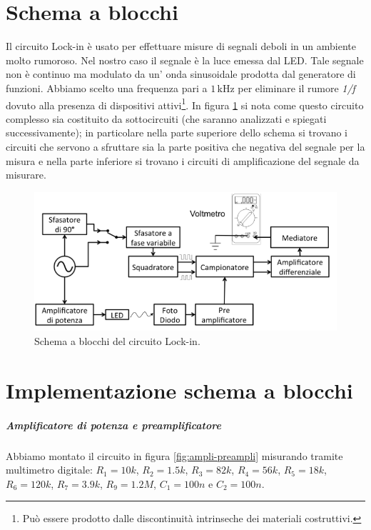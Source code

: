 \documentclass[10pt,a4paper]{article}
\begin{document}
\section{Schema a blocchi}
Il circuito Lock-in è usato per effettuare misure di segnali deboli in un ambiente molto rumoroso. Nel nostro caso il segnale è la luce emessa dal LED. Tale segnale non è continuo ma modulato da un' onda sinusoidale prodotta dal generatore di funzioni. Abbiamo scelto una frequenza pari a $1\,\mbox{kHz}$ per eliminare il rumore \emph{1/f} dovuto alla presenza di dispositivi attivi\footnote{Può essere prodotto dalle discontinuità intrinseche dei materiali costruttivi.}. In figura \ref{fig:schemablocchi} si nota come questo circuito complesso sia costituito da sottocircuiti (che saranno analizzati e spiegati successivamente); in particolare nella parte superiore dello schema si trovano i circuiti che servono a sfruttare sia la parte positiva che negativa del segnale per la misura e nella parte inferiore si trovano i circuiti di amplificazione del segnale da misurare.

\begin{figure}[!htb]
  \centering
  \includegraphics[scale=0.75]{schemablocchi.png}
\caption{Schema a blocchi del circuito Lock-in.\label{fig:schemablocchi}}
\end{figure}


\section{Implementazione schema a blocchi}

\subparagraph{Amplificatore di potenza e preamplificatore}
Abbiamo montato il circuito in figura \ref{fig:ampli-preampli} misurando tramite multimetro digitale: $R_1=10k$, $R_2=1.5k$, $R_3=82k$, $R_4=56k$, $R_5=18k$, $R_6=120k$, $R_7=3.9k$, $R_9=1.2M$, $C_1=100n$ e $C_2=100n$.\\
\end{document}
